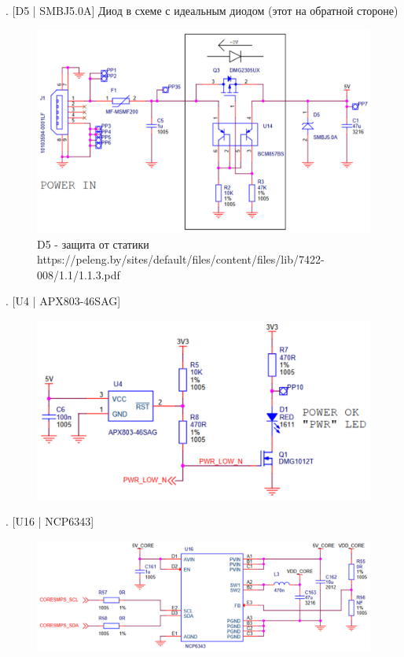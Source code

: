 . [D5 | SMBJ5.0A] Диод в схеме с идеальным диодом (этот на обратной стороне)
\begin{figure}[H]
  \centering
  \includegraphics[width=\textwidth]{img/D5.pdf}
  D5 - защита от статики
  https://peleng.by/sites/default/files/content/files/lib/7422-008/1.1/1.1.3.pdf
\end{figure}

. [U4 | APX803-46SAG]
\begin{figure}[H]
  \centering
  \includegraphics[width=\textwidth]{img/U4.pdf}
\end{figure}

. [U16 | NCP6343]
\begin{figure}[H]
  \centering
  \includegraphics[width=\textwidth]{img/U16.pdf}
\end{figure}


